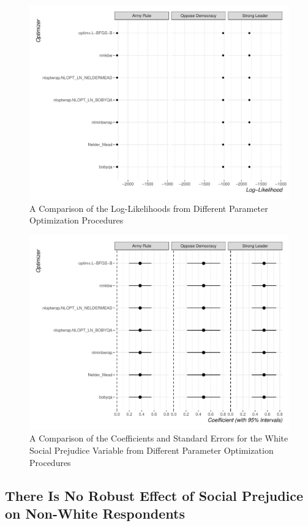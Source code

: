 \documentclass[11pt,]{article}
\begin{document}
\begin{figure}
\centering
\includegraphics{figs/optimllk.pdf}
\caption{\label{fig:optimllk}A Comparison of the Log-Likelihoods from
Different Parameter Optimization Procedures}
\end{figure}

\begin{figure}
\centering
\includegraphics{figs/optimwnneighb.pdf}
\caption{\label{fig:optimwnneighb}A Comparison of the Coefficients and
Standard Errors for the White Social Prejudice Variable from Different
Parameter Optimization Procedures}
\end{figure}

\hypertarget{there-is-no-robust-effect-of-social-prejudice-on-non-white-respondents}{%
\subsection{There Is No Robust Effect of Social Prejudice on Non-White
Respondents}\label{there-is-no-robust-effect-of-social-prejudice-on-non-white-respondents}}
\end{document}
